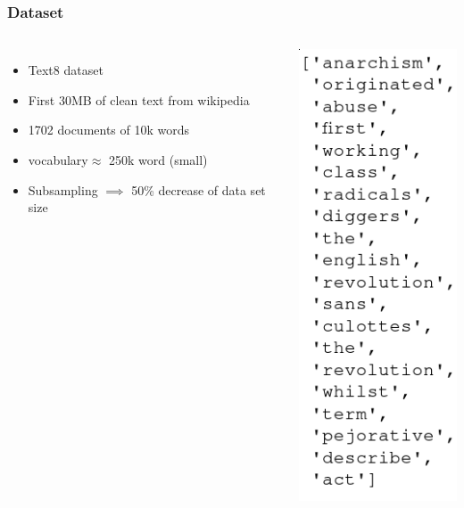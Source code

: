 \begin{frame}
\frametitle{Dataset} 
\begin{columns}
    \begin{itemize}
\item Text8 dataset
\item First 30MB of clean text from wikipedia 
\item 1702 documents of 10k words  
\item vocabulary$\approx$ 250k word (small) 
\item Subsampling $\implies$ 50\% decrease of data set size
\end{itemize}
        \includegraphics[scale=0.35]{images/text8snippet}
  \end{columns}
\end{frame}

